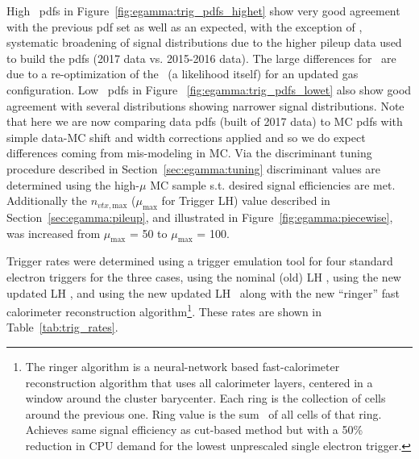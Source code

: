 High \et\ pdfs in Figure~\ref{fig:egamma:trig_pdfs_highet} show very good agreement with the previous pdf set as well as an expected, with the exception of \TRTPID, systematic broadening of signal distributions due to the higher pileup data used to build the pdfs (2017 data vs. 2015-2016 data).
The large differences for \TRTPID\ are due to a re-optimization of the \TRTPID\ (a likelihood itself) for an updated gas configuration.
Low \et\ pdfs in Figure ~\ref{fig:egamma:trig_pdfs_lowet} also show good agreement with several distributions showing narrower signal distributions.
Note that here we are now comparing data pdfs (built of 2017 data) to MC pdfs with simple data-MC shift and width corrections applied and so we do expect differences coming from mis-modeling in MC.
Via the discriminant tuning procedure described in Section~\ref{sec:egamma:tuning} discriminant values are determined using the high-$\mu$ MC sample s.t. desired signal efficiencies are met.
Additionally the $n_{vtx,\text{max}}$ ($\mu_{\text{max}}$ for Trigger LH) value described in Section~\ref{sec:egamma:pileup}, and illustrated in Figure~\ref{fig:egamma:piecewise}, was increased from $\mu_{\text{max}}$ = 50 to $\mu_{\text{max}}$ = 100.

Trigger rates were determined using a trigger emulation tool for four standard electron triggers for the three cases, using the nominal (old) LH \tune, using the new updated LH \tune, and using the new updated LH \tune\ along with the new ``ringer'' fast calorimeter reconstruction algorithm\footnote{
The ringer algorithm is a neural-network based fast-calorimeter reconstruction algorithm that uses all calorimeter layers, centered in a window around the cluster barycenter. 
Each ring is the collection of cells around the previous one.
Ring value is the sum \ET\ of all cells of that ring. Achieves same signal efficiency as cut-based method but with a 50\% reduction in CPU demand for the lowest unprescaled single electron trigger.}.
These rates are shown in Table~\ref{tab:trig_rates}.


